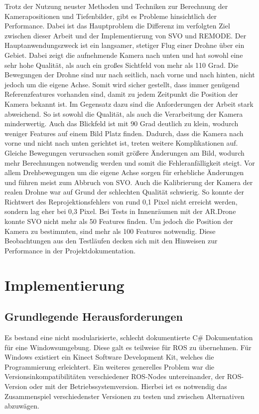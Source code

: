 Trotz der Nutzung neuster Methoden und Techniken zur Berechnung der Kamerapositionen und Tiefenbilder, gibt es Probleme hinsichtlich der Performance. Dabei ist das Hauptproblem die Differenz im verfolgten Ziel zwischen dieser Arbeit und der Implementierung von SVO und REMODE. \newline
Der Hauptanwendungszweck ist ein langsamer, stetiger Flug einer Drohne über ein Gebiet. Dabei zeigt die aufnehmende Kamera nach unten und hat sowohl eine sehr hohe Qualität, als auch ein großes Sichtfeld von mehr als 110 Grad. Die Bewegungen der Drohne sind nur nach seitlich, nach vorne und nach hinten, nicht jedoch um die eigene Achse. Somit wird sicher gestellt, dass immer genügend Referenzfeatures vorhanden sind, damit zu jedem Zeitpunkt die Position der Kamera bekannt ist. \newline
Im Gegensatz dazu sind die Anforderungen der Arbeit stark abweichend. So ist sowohl die Qualität, als auch die Verarbeitung der Kamera minderwertig. Auch das Blickfeld ist mit 90 Grad deutlich zu klein, wodurch weniger Features auf einem Bild Platz finden. \newline
Dadurch, dass die Kamera nach vorne und nicht nach unten gerichtet ist, treten weitere Komplikationen auf. Gleiche Bewegungen verursachen somit größere Änderungen am Bild, wodurch mehr Berechnungen notwendig werden und somit die Fehleranfälligkeit steigt. Vor allem Drehbewegungen um die eigene Achse sorgen für erhebliche Änderungen und führen meist zum Abbruch von SVO. \newline
Auch die Kalibrierung der Kamera der realen Drohne war auf Grund der schlechten Qualität schwierig. So konnte der Richtwert des Reprojektionsfehlers von rund 0,1 Pixel nicht erreicht werden, sondern lag eher bei 0,3 Pixel. \newline
Bei Tests in Innenräumen mit der AR.Drone konnte SVO nicht mehr als 50 Features finden. Um jedoch die Position der Kamera zu bestimmten, sind mehr als 100 Features notwendig.
Diese Beobachtungen aus den Testläufen decken sich mit den Hinweisen zur Performance in der Projektdokumentation\cite{svodocs}. \newline


\newpage
\section{Implementierung}
\subsection{Grundlegende Herausforderungen}
Es bestand eine nicht modularisierte, schlecht dokumentierte C\# Dokumentation für eine Windowsumgebung. Diese galt es teilweise für ROS zu übernehmen. Für Windows existiert ein Kinect Software Development Kit, welches die Programmierung erleichtert. Ein weiteres generelles Problem war die Versionsinkompatibilitäten verschiedener ROS-Nodes untereinander, der ROS-Version oder mit der Betriebssystemversion. Hierbei ist es notwendig das Zusammenspiel verschiedenster Versionen zu testen und zwischen Alternativen abzuwägen. 

